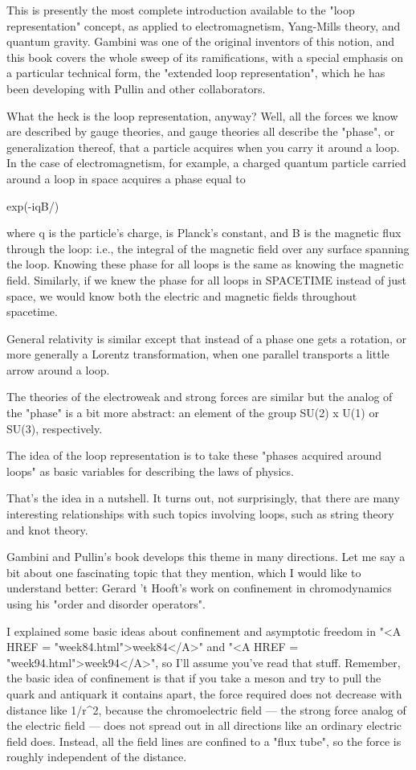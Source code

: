 This is presently the most complete introduction available to the "loop
representation" concept, as applied to electromagnetism, Yang-Mills
theory, and quantum gravity.  Gambini was one of the original
inventors of this notion, and this book covers the whole sweep of its
ramifications, with a special emphasis on a particular technical form,
the "extended loop representation", which he has been developing with
Pullin and other collaborators.  

What the heck is the loop representation, anyway?  Well, all the
forces we know are described by gauge theories, and gauge theories
all describe the "phase", or generalization thereof, that a particle
acquires when you carry it around a loop.  In the case of electromagnetism,
for example, a charged quantum particle carried around a loop in space
acquires a phase equal to 

exp(-iqB/\hbar )

where q is the particle's charge, \hbar  is Planck's constant, and B is
the magnetic flux through the loop: i.e., the integral of the magnetic
field over any surface spanning the loop.  Knowing these phase for all
loops is the same as knowing the magnetic field.  Similarly, if we
knew the phase for all loops in SPACETIME instead of just space, we
would know both the electric and magnetic fields throughout spacetime.

General relativity is similar except that instead of a phase one
gets a rotation, or more generally a Lorentz transformation, when
one parallel transports a little arrow around a loop.  

The theories of the electroweak and strong forces are similar but
the analog of the "phase" is a bit more abstract: an element of the
group SU(2) x U(1) or SU(3), respectively.

The idea of the loop representation is to take these "phases acquired
around loops" as basic variables for describing the laws of physics.

That's the idea in a nutshell.  It turns out, not surprisingly, 
that there are many interesting relationships with such topics
involving loops, such as string theory and knot theory.

Gambini and Pullin's book develops this theme in many directions.  Let
me say a bit about one fascinating topic that they mention, which I
would like to understand better: Gerard 't Hooft's work on confinement
in chromodynamics using his "order and disorder operators".

I explained some basic ideas about confinement and asymptotic freedom
in "<A HREF = "week84.html">week84</A>" and "<A HREF = "week94.html">week94</A>", so I'll assume you've read that stuff.
Remember, the basic idea of confinement is that if you take a meson
and try to pull the quark and antiquark it contains apart, the force
required does not decrease with distance like 1/r^2, because the
chromoelectric field --- the strong force analog of the electric field
--- does not spread out in all directions like an ordinary electric
field does.  Instead, all the field lines are confined to a "flux
tube", so the force is roughly independent of the distance.

